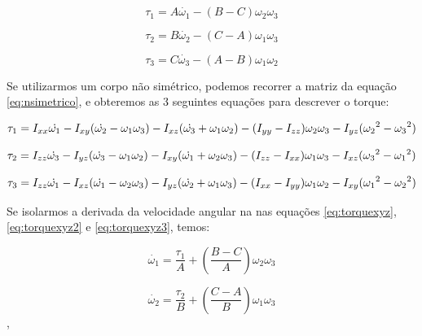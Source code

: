 \begin{equation}
  \tau_1=A\dot{\omega_1}-(B-C)\omega_2\omega_3 
\end{equation}

\begin{equation}
  \tau_2=B\dot{\omega_2}-(C-A)\omega_1\omega_3 
\end{equation}

\begin{equation}
  \tau_3=C\dot{\omega_3}-(A-B)\omega_1\omega_2
\end{equation}

Se utilizarmos um corpo não simétrico, podemos recorrer a matriz da equação \ref{eq:nsimetrico}, e obteremos as 3 seguintes equações para descrever o torque:

\begin{equation}\label{eq:torquexyz}
 \tau_{1}=I_{xx}\dot{\omega_{1}}-I_{xy}(\dot{\omega_{2}}-\omega_{1}\omega_{3})-I_{xz}(\dot{\omega_{3}}+\omega_{1}\omega_{2})\\-(I_{yy}-I_{zz})\omega_{2}\omega_{3}-I_{yz}({\omega_{2}}^{2}-{\omega_{3}}^{2})
\end{equation}

\begin{equation}\label{eq:torquexyz2}
  \tau_{2}=I_{zz}\dot{\omega_{3}}-I_{yz}(\dot{\omega_{3}}-\omega_{1}\omega_{2})-I_{xy}(\dot{\omega_{1}}+\omega_{2}\omega_{3})\\-(I_{zz}-I_{xx})\omega_{1}\omega_{3}-I_{xz}({\omega_{3}}^{2}-{\omega_{1}}^{2})
\end{equation}

\begin{equation}\label{eq:torquexyz3}
 \tau_{3}=I_{zz}\dot{\omega_{1}}-I_{xz}(\dot{\omega_{1}}-\omega_{2}\omega_{3})-I_{yz}(\dot{\omega_{2}}+\omega_{1}\omega_{3})\\-(I_{xx}-I_{yy})\omega_{1}\omega_{2}-I_{xy}({\omega_{1}}^{2}-{\omega_{2}}^{2})
\end{equation}

Se isolarmos a derivada da velocidade angular na nas equações \ref{eq:torquexyz}, \ref{eq:torquexyz2} e \ref{eq:torquexyz3}, temos:

\begin{equation}
  \dot{\omega_{1}}=\frac{\tau_{1}}{A}+\left(\frac{B-C}{A}\right)\omega_{2}\omega_{3}
\end{equation}

\begin{equation}
  \dot{\omega_{2}}=\frac{\tau_{2}}{B}+\left(\frac{C-A}{B}\right)\omega_{1}\omega_{3}
\end{equation},


